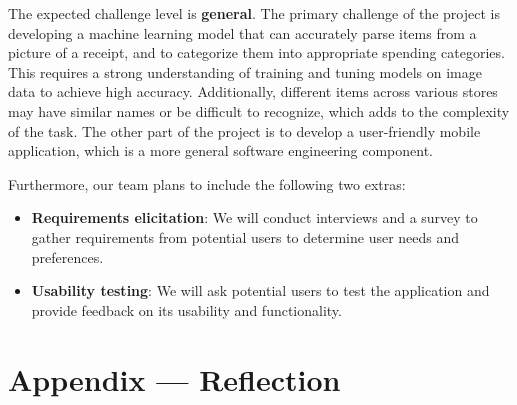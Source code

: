 \documentclass{article}
\begin{document}
The expected challenge level is \textbf{general}. The primary challenge of the
project is developing a machine learning model that can accurately parse items
from a picture of a receipt, and to categorize them into appropriate spending
categories. This requires a strong understanding of training and tuning models
on image data to achieve high accuracy. Additionally, different items across
various stores may have similar names or be difficult to recognize, which adds
to the complexity of the task. The other part of the project is to develop a
user-friendly mobile application, which is a more general software engineering
component.

Furthermore, our team plans to include the following two extras:
\begin{itemize}
    \item \textbf{Requirements elicitation}: We will conduct interviews and a
    survey to gather requirements from potential users to determine user needs
    and preferences.
    \item \textbf{Usability testing}: We will ask potential users to test the
    application and provide feedback on its usability and functionality.

\end{itemize}

\newpage{}

\section*{Appendix --- Reflection}


\end{document}

